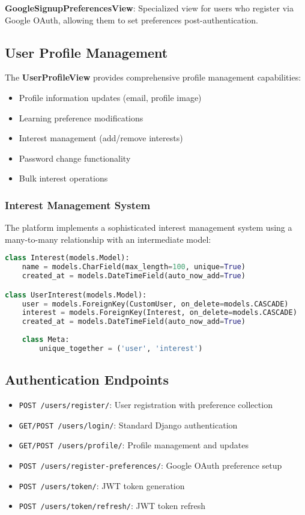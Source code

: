 \documentclass[12pt,a4paper]{article}
\begin{document}
\textbf{GoogleSignupPreferencesView}: Specialized view for users who register via Google OAuth, allowing them to set preferences post-authentication.

\subsection{User Profile Management}

The \textbf{UserProfileView} provides comprehensive profile management capabilities:

\begin{itemize}
    \item Profile information updates (email, profile image)
    \item Learning preference modifications
    \item Interest management (add/remove interests)
    \item Password change functionality
    \item Bulk interest operations
\end{itemize}

\subsubsection{Interest Management System}

The platform implements a sophisticated interest management system using a many-to-many relationship with an intermediate model:

\begin{lstlisting}[language=Python, caption=Interest Management Models]
class Interest(models.Model):
    name = models.CharField(max_length=100, unique=True)
    created_at = models.DateTimeField(auto_now_add=True)

class UserInterest(models.Model):
    user = models.ForeignKey(CustomUser, on_delete=models.CASCADE)
    interest = models.ForeignKey(Interest, on_delete=models.CASCADE)
    created_at = models.DateTimeField(auto_now_add=True)
    
    class Meta:
        unique_together = ('user', 'interest')
\end{lstlisting}

\subsection{Authentication Endpoints}

\begin{itemize}
    \item \texttt{POST /users/register/}: User registration with preference collection
    \item \texttt{GET/POST /users/login/}: Standard Django authentication
    \item \texttt{GET/POST /users/profile/}: Profile management and updates
    \item \texttt{POST /users/register-preferences/}: Google OAuth preference setup
    \item \texttt{POST /users/token/}: JWT token generation
    \item \texttt{POST /users/token/refresh/}: JWT token refresh
\end{itemize}
\end{document}
